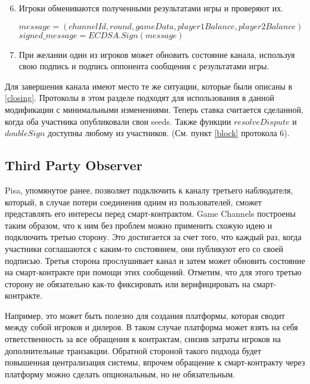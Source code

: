 \begin{algorithm}
\begin{enumerate}
\setcounter{enumi}{5}
 \item Игроки обмениваются полученными результатами игры и проверяют их. 
\begin{center}
 $message = (channelId, round, gameData, player1Balance, player2Balance)$
 $signed\_message = ECDSA.Sign(message)$
\end{center}
\item При желании один из игроков может обновить состояние канала, используя свою подпись и подпись оппонента сообщения с результатами игры.
\end{enumerate}
\end{algorithm}

Для завершения канала имеют место те же ситуации, которые были описаны в \autoref{closing}. Протоколы в этом разделе подходят для использования в данной модификации с минимальными изменениями. Теперь ставка считается сделанной, когда оба участника опубликовали свои seeds. Также функции $resolveDispute$ и $doubleSign$ доступны любому из участников. (См. пункт \ref{block} протокола 6). 

	\subsection{Third Party Observer}
Pisa, упомянутое ранее, позволяет подключить к каналу третьего наблюдателя, который, в случае потери соединения одним из пользователей, сможет представлять его интересы перед смарт-контрактом. Game Channels построены таким образом, что к ним без проблем можно применить схожую идею и подключить третью сторону. Это достигается за счет того, что каждый раз, когда участники соглашаются с каким-то состоянием, они публикуют его со своей подписью. Третья сторона прослушивает канал и затем может обновить состояние на смарт-контракте при помощи этих сообщений. Отметим, что для этого третью сторону не обязательно как-то фиксировать или верифицировать на смарт-контракте. 

Например, это может быть полезно для создания платформы, которая сводит между собой игроков и дилеров. В таком случае платформа может взять на себя ответственность за все обращения к контрактам, снизив затраты игроков на дополнительные транзакции. Обратной стороной такого подхода будет повышенная централизация системы, впрочем обращение к смарт-контракту через платформу можно сделать опциональным, но не обязательным. 
 